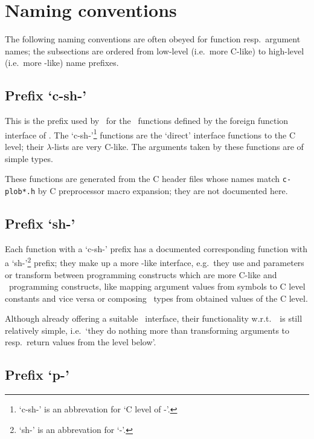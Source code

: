 \section{Naming conventions}

The following naming conventions are often obeyed for function resp.\ 
argument names; the subsections are ordered from low-level (i.e.\ more
C-like) to high-level (i.e.\ more \cl-like) name prefixes.

\subsection{Prefix `c-sh-'}

This is the prefix used by \plob\ for the \cl\ functions defined by
the foreign function interface of \lw. The `c-sh-'\footnote{`c-sh-' is
  an abbrevation for `C level of \sh-'.} functions are the `direct'
interface functions to the C level; their $\lambda$-lists are very
C-like. The arguments taken by these functions are of simple types.

These functions are generated from the C header files whose
names match {\tt c-plob*.h} by C preprocessor macro expansion; they
are not documented here.

\subsection{Prefix `sh-'}

Each function with a `c-sh-' prefix has a documented corresponding
function with a `sh-'\footnote{`sh-' is an abbrevation for `\sh-'.}
prefix; they make up a more \cl-like interface, e.g.\ they use {\opt}
and {\key{}} parameters or transform between programming constructs
which are more C-like and \cl\ programming constructs, like mapping
argument values from symbols to C level \lisp{enum} constants and vice
versa or composing \cl\ types from obtained values of the C level.

Although already offering a suitable \cl\ interface, their
functionality w.r.t.\ \cl\ is still relatively simple, i.e.\ `they do
nothing more than transforming arguments to resp.\ return values from
the level below'.

\subsection{Prefix `p-'}

